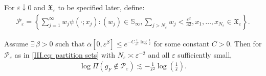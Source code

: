 For $\varepsilon \downarrow 0$ and $\mathfrak{X}_\varepsilon$ to be specified later, define:
\begin{align}\label{III.eq: partition sets}
    \mathcal{P}_{\varepsilon}=\left\{\sum_{j=1}^{\infty} w_j \psi\left(\cdot ; x_j\right):\left(w_j\right) \in \mathbb{S}_{\infty}, \sum_{j>N_{\varepsilon}} w_j<\frac{\varepsilon^2}{32}, x_1,\ldots,x_{N_\varepsilon} \in \mathfrak{X}_\varepsilon \right\}.  
\end{align}
\begin{lemma}[Sieves]\label{III.lemma: prior mass partition}
    Assume $\exists \, \beta >0$ such that $\overline{\alpha} [0,\varepsilon^{\beta}] \leq  e^{-C \frac{1}{\varepsilon^2}\log{\frac{1}{\varepsilon}}}$ for some constant $C>0$. Then for $\mathcal{P}_{\varepsilon}$ as in \eqref{III.eq: partition sets} with $N_\varepsilon \asymp \varepsilon^{-2}$ and all $\varepsilon$ sufficiently small,
    \begin{align*}
        \log{\Pi(g_{\scriptscriptstyle{F}} \notin \mathcal{P}_\varepsilon)} \lesssim -\frac{1}{\varepsilon^2} \log{\left( \frac{1}{\varepsilon} \right)}. 
    \end{align*}
\end{lemma}
